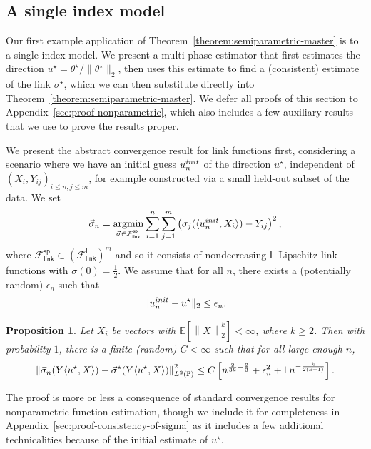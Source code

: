 \documentclass[11pt]{article}
\newcommand{\E}{\mathbb{E}}
\newcommand{\Prb}{\mathbb{P}}
\newcommand{\norm}[1]{\left\|{#1}\right\|} %
\newcommand{\lipconst}{\mathsf{L}}
\newcommand{\fsymlinkL}{\mathcal{F}_{\mathsf{link}}^{\mathsf{L}}}
\newcommand{\fsymlinksp}{\mathcal{F}_{\mathsf{link}}^{\mathsf{sp}}}
\newcommand{\ltwo}[1]{\norm{#1}_2} %
\newcommand{\norms}[1]{\|{#1}\|} %
\newcommand{\ltwos}[1]{\norms{#1}_2} %
\newcommand{\<}{\langle} %
\renewcommand{\>}{\rangle}
\DeclareMathOperator*{\argmin}{argmin}
\newcommand{\LtwoPbold}[1]{\norm{#1}_{L^2(\Prb)}}
\newcommand{\LtwoQ}[1]{\norm{#1}_{L^2(Q)}}
\newcommand{\half}{\frac{1}{2}}
\newcommand{\opt}{^\star}
\newcommand{\subopt}{_\star}
\newtheorem{proposition}{Proposition}
\begin{document}
\subsection{A single index model}
\label{sec:semiparametric}

Our first example application of Theorem~\ref{theorem:semiparametric-master}
is to a single index model. We present a multi-phase estimator that first
estimates the direction $u\opt = \theta\opt / \ltwos{\theta\opt}$, then uses
this estimate to find a (consistent) estimate of the link $\sigma\opt$,
which we can then substitute directly into
Theorem~\ref{theorem:semiparametric-master}.
We defer all proofs of this section to Appendix~\ref{sec:proof-nonparametric},
which also includes a few auxiliary results that we use to prove the
results proper.

We present the abstract convergence result for link functions first,
considering a scenario where we have an initial guess $\uinit$ of the
direction $u\opt$, independent of $(X_i, Y_{ij})_{i \le n,j\le m}$, for
example constructed via a small held-out subset of the data. We set
\begin{equation*}
  \vec{\sigma}_n = \argmin_{\vec{\sigma} \in \fsymlinksp}
  \sum_{i = 1}^n\sum_{j = 1}^m
  \left(\sigma_j(\<\uinit, X_i\>) - Y_{ij}\right)^2,
\end{equation*}
where $\fsymlinksp \subset (\fsymlinkL)^m$ and so it consists of
nondecreasing $\lipconst$-Lipschitz link functions with $\sigma(0) = \half$.
We assume that for all $n$, there exists a (potentially random) $\epsilon_n$
such that
\begin{equation*}
  \ltwos{\uinit - u\opt} \le \uerror_n.
\end{equation*}
\begin{proposition}
  \label{proposition:consistency-of-sigma}
  Let $X_i$ be vectors with $\E[\ltwo{X}^k] < \infty$, where
  $k \ge 2$. Then with probability $1$,
  there is a finite (random)
  $C < \infty$ such that for all large enough $n$,
  \begin{equation*}
    \LtwoPbold{\vec{\sigma}_n(Y\<u\opt, X\>)
      - \vec{\sigma}\opt(Y\<u\opt, X\>)}^2
    \le C \left[
      n^{\frac{2}{3k} - \frac{2}{3}}
      + \uerror_n^2
      + \lipconst n^{-\frac{k}{2(k + 1)}}
      \right].
  \end{equation*}
\end{proposition}
\noindent
The proof is more or less a consequence of standard convergence results
for nonparametric function estimation, though we include
it for completeness in Appendix~\ref{sec:proof-consistency-of-sigma}
as it includes a few additional technicalities because
of the initial estimate of $u\opt$.
\end{document}
